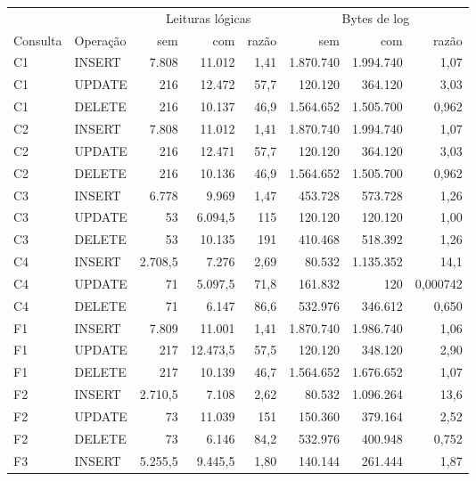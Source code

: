 {\small\setlength{\tabcolsep}{4pt}
\begin{tabular}{llrrrrrr}
\toprule
 &  & \multicolumn{3}{c}{Leituras lógicas} & \multicolumn{3}{c}{Bytes de log} \\
\cmidrule(lr){3-5}\cmidrule(lr){6-8}
Consulta & Operação & sem & com & razão & sem & com & razão \\
\midrule
C1 & INSERT & 7.808 & 11.012 & 1,41 & 1.870.740 & 1.994.740 & 1,07 \\
C1 & UPDATE & 216 & 12.472 & 57,7 & 120.120 & 364.120 & 3,03 \\
C1 & DELETE & 216 & 10.137 & 46,9 & 1.564.652 & 1.505.700 & 0,962 \\
C2 & INSERT & 7.808 & 11.012 & 1,41 & 1.870.740 & 1.994.740 & 1,07 \\
C2 & UPDATE & 216 & 12.471 & 57,7 & 120.120 & 364.120 & 3,03 \\
C2 & DELETE & 216 & 10.136 & 46,9 & 1.564.652 & 1.505.700 & 0,962 \\
C3 & INSERT & 6.778 & 9.969 & 1,47 & 453.728 & 573.728 & 1,26 \\
C3 & UPDATE & 53 & 6.094,5 & 115 & 120.120 & 120.120 & 1,00 \\
C3 & DELETE & 53 & 10.135 & 191 & 410.468 & 518.392 & 1,26 \\
C4 & INSERT & 2.708,5 & 7.276 & 2,69 & 80.532 & 1.135.352 & 14,1 \\
C4 & UPDATE & 71 & 5.097,5 & 71,8 & 161.832 & 120 & 0,000742 \\
C4 & DELETE & 71 & 6.147 & 86,6 & 532.976 & 346.612 & 0,650 \\
F1 & INSERT & 7.809 & 11.001 & 1,41 & 1.870.740 & 1.986.740 & 1,06 \\
F1 & UPDATE & 217 & 12.473,5 & 57,5 & 120.120 & 348.120 & 2,90 \\
F1 & DELETE & 217 & 10.139 & 46,7 & 1.564.652 & 1.676.652 & 1,07 \\
F2 & INSERT & 2.710,5 & 7.108 & 2,62 & 80.532 & 1.096.264 & 13,6 \\
F2 & UPDATE & 73 & 11.039 & 151 & 150.360 & 379.164 & 2,52 \\
F2 & DELETE & 73 & 6.146 & 84,2 & 532.976 & 400.948 & 0,752 \\
F3 & INSERT & 5.255,5 & 9.445,5 & 1,80 & 140.144 & 261.444 & 1,87 \\

\end{tabular}}
